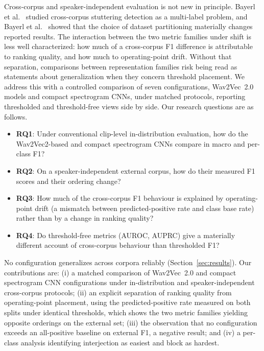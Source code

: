 \documentclass[a4paper,orivec]{llncs}
\begin{document}
Cross-corpus and speaker-independent evaluation is not new in principle. Bayerl
et al.~\cite{bayerl2023crosscorpus} studied cross-corpus stuttering detection as
a multi-label problem, and Bayerl et al.~\cite{bayerl2022partitioning} showed that
the choice of dataset partitioning materially changes reported results. The
interaction between the two metric families under shift is less well
characterized: how much of a cross-corpus F1 difference is attributable to
ranking quality, and how much to operating-point drift. Without that separation,
comparisons between representation families risk being read as statements about
generalization when they concern threshold placement. We address this with a
controlled comparison of seven configurations, Wav2Vec~2.0 models and compact
spectrogram CNNs, under matched protocols, reporting thresholded and
threshold-free views side by side. Our research questions are as follows.
\begin{itemize}
\item \textbf{RQ1}: Under conventional clip-level in-distribution
evaluation, how do the Wav2Vec2-based and compact spectrogram CNNs compare in
macro and per-class F1?
\item \textbf{RQ2}: On a speaker-independent external corpus, how do their
measured F1 scores and their ordering change?
\item \textbf{RQ3}: How much of the cross-corpus F1 behaviour is explained by
operating-point drift (a mismatch between predicted-positive rate and class
base rate) rather than by a change in ranking quality?
\item \textbf{RQ4}: Do threshold-free metrics (AUROC, AUPRC) give a
materially different account of cross-corpus behaviour than thresholded F1?
\end{itemize}

No configuration generalizes across corpora reliably
(Section~\ref{sec:results}). Our contributions
are: (i) a matched comparison of Wav2Vec~2.0 and compact spectrogram CNN
configurations under in-distribution and speaker-independent cross-corpus
protocols; (ii) an explicit separation of ranking quality from operating-point
placement, using the predicted-positive rate measured on both splits under
identical thresholds, which shows the two metric families yielding opposite
orderings on the external set; (iii) the observation that no configuration
exceeds an all-positive baseline on external F1, a negative result; and (iv) a
per-class analysis identifying interjection as
easiest and block as hardest.
\end{document}
